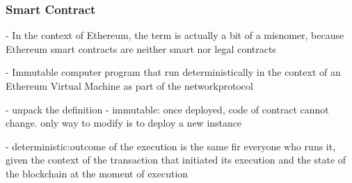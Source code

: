 \subsubsection{Smart Contract}

- In the context of Ethereum, the term is actually a bit of a misnomer, 
because Ethereum smart contracts are neither smart nor legal contracts 

- Immutable computer program that run deterministically in the context of an 
Ethereum Virtual Machine as part of the networkprotocol 

- unpack the definition
	- immutable: once deployed, code of contract cannot change. 
	only way to modify is to deploy a new instance

	- deterministic:outcome of the execution is the same fir everyone who runs it,
	given the context of the transaction that initiated its execution and the state of 
	the blockchain at the moment of execution 

	


\clearpage